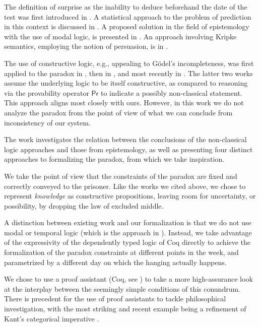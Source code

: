\documentclass[runningheads]{llncs}
\begin{document}
The definition of surprise as the inability to deduce beforehand the date of the test
was first introduced in \cite{prediction}. A statistical approach to the problem
of prediction in this context is discussed in \cite{statistical}.
A proposed solution in the field of epistemology with the use of modal
logic, is presented in \cite{modalepistemic}. An approach involving
Kripke semantics, employing the notion of persuasion, is in \cite{kripkemodal}.

The use of constructive logic,
e.g., appealing to G\"{o}del's incompleteness, was first applied to the
paradox in \cite{goedelized}, then in \cite{godelinconsistent}, and most recently
in \cite{constructive} \cite{nonpredet}. The latter two works assume the underlying logic to be itself
constructive, as compared to reasoning via the provability operator $\mathsf{Pr}$ to indicate
a possibly non-classical statement. This approach aligns most closely with ours.
However, in this work we do not analyze the paradox from the point of view of
what we can conclude from inconsistency of our system.

The work \cite{fourpossible} investigates the relation between the conclusions
of the non-classical logic approaches and those from epistemology, as well
as presenting four distinct approaches to formalizing the paradox, from which
we take inspiration.

We take the point of view that the constraints of the paradox are
fixed and correctly conveyed to the prisoner.
Like the works we cited above, we chose to represent
\emph{knowledge} as constructive propositions, leaving room for uncertainty, or possibility, by
dropping the law of excluded middle.

A distinction between existing work and our formalization is that
we do not use modal or temporal logic (which is the approach in \cite{modalepistemic}).
Instead, we take advantage of the expressivity of the dependently typed logic of Coq directly to
achieve the formalization of the paradox constraints at different points in the week,
and parametrized by a different day on which the hanging actually happens.

We chose to use a proof
assistant (Coq, see \cite{coqmanual}) to take a more high-assurance look at the
interplay between the seemingly simple conditions of this conundrum.
There is precedent for the use of proof assistants to tackle philosophical
investigation, with the most striking and recent example
being a refinement of Kant's categorical imperative \cite{categoricalkant}.
\end{document}
